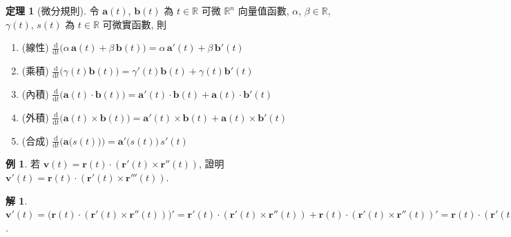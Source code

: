 \documentclass[12pt]{extarticle}
\newcommand{\ds}{\displaystyle}
\theoremstyle{definition}
\newtheorem*{thm}{定理}
\newtheorem*{ex}{例}
\newtheorem*{sol}{解}
\newcommand{\vr}{\mathbf{r}}
\newcommand{\vv}{\mathbf{v}}
\newcommand{\va}{\mathbf{a}}
\newcommand{\vb}{\mathbf{b}}
\newcommand{\ga}{\gamma}
\newcommand{\bbbr}{\mathbb{R}}
\newcommand{\diff}[2]{\frac{\mathrm{d} #1}{\mathrm{d} #2}}
\begin{document}
\begin{thm}[微分規則] 令 $\va(t)$, $\vb(t)$ 為 $t\in\bbbr$ 可微 $\bbbr^n$ 向量值函數, $\alpha$, $\beta\in\mathbb{R}$, $\ga(t)$, $s(t)$ 為 $t\in\bbbr$ 可微實函數, 則
  \begin{enumerate}\setlength{\itemsep}{0pt}
    \item (線性) $\ds\diff{}{t}\big(\alpha\,\va(t) + \beta\,\vb(t)\big) = \alpha\,\va'(t) + \beta\,\vb'(t)$
    \item (乘積) $\ds\diff{}{t}\big(\ga(t)\vb(t)\big) = \ga'(t)\vb(t)+\ga(t)\vb'(t)$
    \item (內積) $\ds\diff{}{t}\big(\va(t)\cdot\vb(t)\big) = \va'(t)\cdot\vb(t) + \va(t)\cdot\vb'(t)$
    \item (外積) $\ds\diff{}{t}\big(\va(t)\times\vb(t)\big) = \va'(t)\times\vb(t) + \va(t)\times\vb'(t)$
    \item (合成) $\ds\diff{}{t}\big(\va\big(s(t)\big)\big) = \va'\big(s(t)\big)\,s'(t)$
  \end{enumerate}
\end{thm}

\begin{ex}
  若 $\ds\vv(t) = \vr(t)\cdot(\vr'(t)\times\vr''(t))$, 證明 $\ds\vv'(t) = \vr(t)\cdot(\vr'(t)\times\vr'''(t))$.
\end{ex}

\begin{sol}
  $\ds\vv'(t) = \big(\vr(t)\cdot(\vr'(t)\times\vr''(t))\big)' = \vr'(t)\cdot(\vr'(t)\times\vr''(t)) + \vr(t)\cdot(\vr'(t)\times\vr''(t))' = \vr(t)\cdot(\vr'(t)\times\vr''(t))' = \vr(t)\cdot(\vr''(t)\times\vr''(t) + \vr'(t)\times\vr'''(t)) = \vr(t)\cdot(\vr'(t)\times\vr'''(t))$.
\end{sol}
\end{document}
